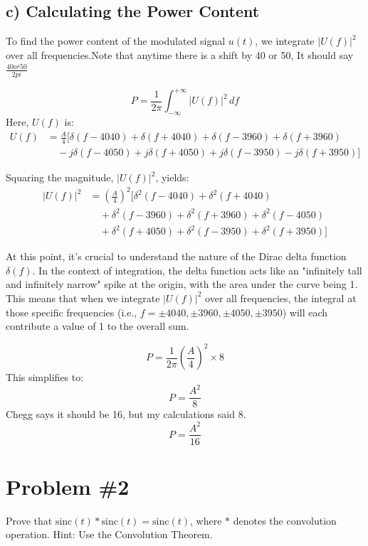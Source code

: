 \documentclass{article}
\begin{document}
\subsection*{c) Calculating the Power Content}

To find the power content of the modulated signal \( u(t) \), we integrate \( |U(f)|^2 \) over all frequencies.Note that anytime there is a shift by 40 or 50, It should say $\frac{40 or 50}{2 pi}$

\[
P = \frac{1}{2\pi} \int_{-\infty}^{+\infty} |U(f)|^2 \, df
\]
Here, \( U(f) \) is:
\begin{align*}
U(f) &= \frac{A}{4} \Bigg[ \delta(f - 4040) + \delta(f + 4040) + \delta(f - 3960) + \delta(f + 3960) \\
& \quad - j\delta(f - 4050) + j\delta(f + 4050) + j\delta(f - 3950) - j\delta(f + 3950) \Bigg]
\end{align*}

Squaring the magnitude, \( |U(f)|^2 \), yields:
\begin{align*}
|U(f)|^2 &= \left(\frac{A}{4}\right)^2 \Bigg[ \delta^2(f - 4040) + \delta^2(f + 4040) \\
& \quad + \delta^2(f - 3960) + \delta^2(f + 3960) + \delta^2(f - 4050) \\
& \quad + \delta^2(f + 4050) + \delta^2(f - 3950) + \delta^2(f + 3950) \Bigg]
\end{align*}

At this point, it's crucial to understand the nature of the Dirac delta function \(\delta(f)\). In the context of integration, the delta function acts like an "infinitely tall and infinitely narrow" spike at the origin, with the area under the curve being 1. This means that when we integrate \( |U(f)|^2 \) over all frequencies, the integral at those specific frequencies (i.e., \(f = \pm 4040, \pm 3960, \pm 4050, \pm 3950\)) will each contribute a value of 1 to the overall sum.

\[
P = \frac{1}{2\pi} \left(\frac{A}{4}\right)^2 \times 8
\]
This simplifies to:
\[
P = \frac{A^2}{8}
\]
Chegg says it should be 16, but my calculations said 8.
\[
P = \frac{A^2}{16}
\]


\newpage
\section*{Problem \#2}
Prove that \(\text{sinc}(t) * \text{sinc}(t) = \text{sinc}(t)\), where \( * \) denotes the convolution operation. Hint: Use the Convolution Theorem. 
\end{document}
